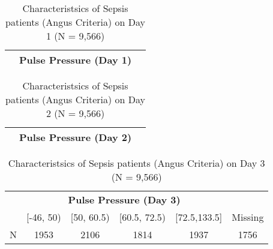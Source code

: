 \begin{table}[h]

\scriptsize{ 
\begin{tabular}{l c c c c c}
\toprule
& \multicolumn{4}{c}{\textbf{Pulse Pressure (Day 1)}}\\



\bottomrule
\end{tabular}
\caption{Characteristsics of Sepsis patients (Angus Criteria) on Day 1 (N = 9,566)}
}
\end{table}



\begin{table}[h]

\scriptsize{ 
\begin{tabular}{l c c c c c}
\toprule
& \multicolumn{4}{c}{\textbf{Pulse Pressure (Day 2)}}\\



\bottomrule
\end{tabular}
\caption{Characteristsics of Sepsis patients (Angus Criteria) on Day 2 (N = 9,566)}
}
\end{table}


\begin{table}[h]

\scriptsize{ 
\begin{tabular}{l c c c c c}
\toprule
& \multicolumn{4}{c}{\textbf{Pulse Pressure (Day 3)}}\\
& [-46, 50) & [50, 60.5) & [60.5, 72.5) & [72.5,133.5] & Missing \\ 
N & 1953 & 2106 & 1814 & 1937 & 1756\\ 



\bottomrule
\end{tabular}
\caption{Characteristsics of Sepsis patients (Angus Criteria) on Day 3 (N = 9,566)}
}
\end{table}




